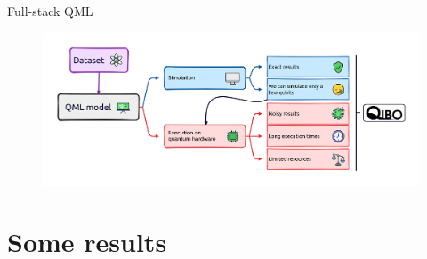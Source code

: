 \documentclass[8pt, xcolor={svgnames}, hyperref={linkcolor=black}]{beamer}
\begin{document}
\begin{frame}{Full-stack QML}
\begin{figure}  
    \includegraphics[width=1\textwidth]{figures/qml_onchip.png}
\end{figure}
\end{frame} 

\section{Some results}
\end{document}
